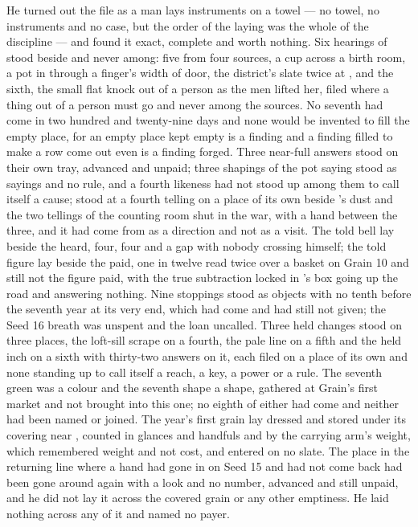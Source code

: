 He turned out the file as a man lays instruments on a towel --- no towel, no instruments and no case, but the order of the laying was the whole of the discipline --- and found it exact, complete and worth nothing. Six hearings of  stood beside and never among: five from four sources, a cup across a birth room, a pot in  through a finger's width of door, the district's slate twice at , and the sixth, the small flat knock out of a person as the men lifted her, filed where a thing out of a person must go and never among the sources. No seventh had come in two hundred and twenty-nine days and none would be invented to fill the empty place, for an empty place kept empty is a finding and a finding filled to make a row come out even is a finding forged. Three near-full answers stood on their own tray, advanced and unpaid; three shapings of the pot saying stood as sayings and no rule, and a fourth likeness had not stood up among them to call itself a cause;  stood at a fourth telling on a place of its own beside 's dust and the two tellings of the counting room shut in the war, with a hand between the three, and it had come from  as a direction and not as a visit. The told bell lay beside the heard, four, four and a gap with nobody crossing himself; the told figure lay beside the paid, one in twelve read twice over a basket on Grain 10 and still not the figure paid, with the true subtraction locked in 's box going up the road and answering nothing. Nine stoppings stood as objects with no tenth before the seventh year at its very end, which had come and had still not given; the Seed 16 breath was unspent and the loan uncalled. Three held changes stood on three places, the loft-sill scrape on a fourth, the pale line on a fifth and the held inch on a sixth with thirty-two answers on it, each filed on a place of its own and none standing up to call itself a reach, a key, a power or a rule. The seventh green was a colour and the seventh shape a shape, gathered at Grain's first market and not brought into this one; no eighth of either had come and neither had been named or joined. The year's first grain lay dressed and stored under its covering near , counted in glances and handfuls and by the carrying arm's weight, which remembered weight and not cost, and entered on no slate. The place in the returning line where a hand had gone in on Seed 15 and had not come back had been gone around again with a look and no number, advanced and still unpaid, and he did not lay it across the covered grain or any other emptiness. He laid nothing across any of it and named no payer.

